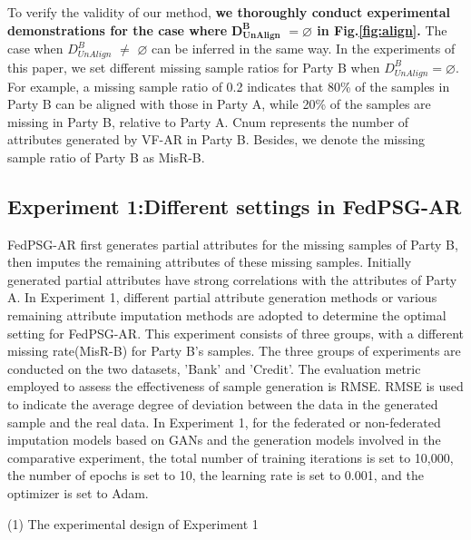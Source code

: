 \documentclass[final,1p,times]{elsarticle}
\begin{document}
To verify the validity of our method, {\bfseries we thoroughly conduct experimental demonstrations for the case where} $\boldsymbol{D_{UnAlign}^B}$
{\bfseries $\boldsymbol{=\varnothing}$ in Fig.\ref{fig:align}.} The case when $D_{UnAlign}^{B}$ $\neq$ $\varnothing$ can be inferred in the same way. In the experiments of this paper, we set different missing sample ratios for Party B when ${D_{UnAlign}^{B}=\varnothing}$. For example, a missing sample ratio of 0.2 indicates that 80\% of the samples in Party B can be aligned with those in Party A, while 20\% of the samples are missing in Party B, relative to Party A. Cnum represents the number of attributes generated by VF-AR in Party B. Besides, we denote the missing sample ratio of Party B as MisR-B.


\subsection{Experiment 1:Different settings in FedPSG-AR}
\label{subsec42}

FedPSG-AR first generates partial attributes for the missing samples of Party B, then imputes the remaining attributes of these missing samples. Initially generated partial attributes have strong correlations with the attributes of Party A. In Experiment 1, different partial attribute generation methods or various remaining attribute imputation methods are adopted to determine the optimal setting for FedPSG-AR. This experiment consists of three groups, with a different missing rate(MisR-B) for Party B's samples. The three groups of experiments are conducted on the two datasets, 'Bank' and 'Credit'. The evaluation metric employed to assess the effectiveness of sample generation is RMSE. RMSE\cite{37} is used to indicate the average degree of deviation between the data in the generated sample and the real data. In Experiment 1, for the federated or non-federated imputation models based on GANs and the generation models involved in the comparative experiment, the total number of training iterations is set to 10,000, the number of epochs is set to 10, the learning rate is set to 0.001, and the optimizer is set to Adam.

(1) The experimental design of Experiment 1
\end{document}
